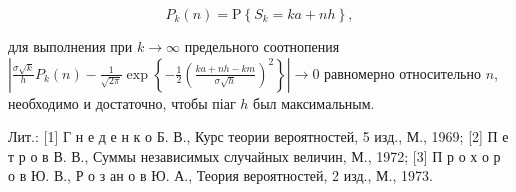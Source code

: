 \documentclass[10pt]{article}
\begin{document}
\[

P_{k}(n)=\mathrm{P}\left\{S_{k}=k a+n h\right\},

\]



для выполнения при $k \rightarrow \infty$ предельного соотнопения $\left|\frac{\sigma \sqrt{k}}{h} P_{k}(n)-\frac{1}{\sqrt{2 \pi}} \exp \left\{-\frac{1}{2}\left(\frac{k a+n h-k m}{\sigma \sqrt{h}}\right)^{2}\right\}\right| \rightarrow 0$ равномерно относительно $n$, необходимо и достаточно, чтобы піаг $h$ был максимальным.



Лит.: [1] Г н е д е н к о Б. В., Курс теории вероятностей, 5 изд., М., 1969; [2] П е т р о в В. В., Суммы независимых случайных величин, М., 1972; [3] П р о х о р о в Ю. В., Р о з ан о в Ю. А., Теория вероятностей, 2 изд., М., 1973.
\end{document}
